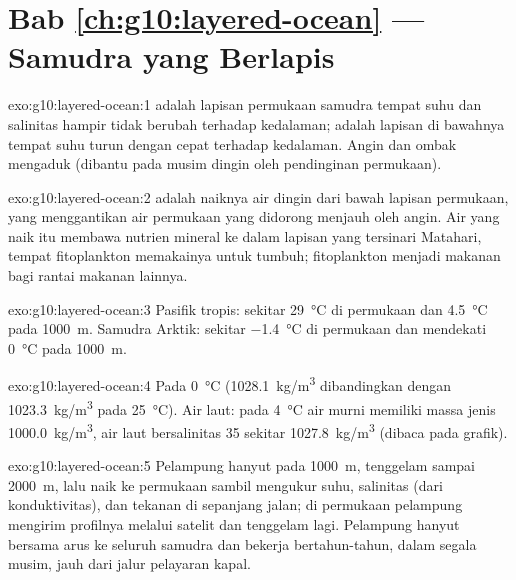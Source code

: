 \section*{Bab \ref{ch:g10:layered-ocean} --- Samudra yang Berlapis}

\begin{solution}{exo:g10:layered-ocean:1}
 adalah lapisan permukaan samudra tempat suhu dan salinitas
hampir tidak berubah terhadap kedalaman;  adalah lapisan di bawahnya
tempat suhu turun dengan cepat terhadap kedalaman. Angin dan ombak mengaduk
 (dibantu pada musim dingin oleh pendinginan permukaan).
\end{solution}

\begin{solution}{exo:g10:layered-ocean:2}
 adalah naiknya air dingin dari bawah lapisan permukaan,
yang menggantikan air permukaan yang didorong menjauh oleh angin. Air yang
naik itu membawa nutrien mineral ke dalam lapisan yang tersinari Matahari,
tempat fitoplankton memakainya untuk tumbuh; fitoplankton menjadi makanan bagi
rantai makanan lainnya.
\end{solution}

\begin{solution}{exo:g10:layered-ocean:3}
Pasifik tropis: sekitar \qty{29}{\degreeCelsius} di permukaan dan
\qty{4.5}{\degreeCelsius} pada \qty{1000}{m}. Samudra Arktik: sekitar
\qty{-1.4}{\degreeCelsius} di permukaan dan mendekati
\qty{0}{\degreeCelsius} pada \qty{1000}{m}.
\end{solution}

\begin{solution}{exo:g10:layered-ocean:4}
Pada \qty{0}{\degreeCelsius} (\qty{1028.1}{kg/m^3} dibandingkan dengan
\qty{1023.3}{kg/m^3} pada \qty{25}{\degreeCelsius}). Air laut: pada
\qty{4}{\degreeCelsius} air murni memiliki massa jenis \qty{1000.0}{kg/m^3},
air laut bersalinitas 35 sekitar \qty{1027.8}{kg/m^3} (dibaca pada grafik).
\end{solution}

\begin{solution}{exo:g10:layered-ocean:5}
Pelampung hanyut pada \qty{1000}{m}, tenggelam sampai \qty{2000}{m}, lalu naik
ke permukaan sambil mengukur suhu, salinitas (dari konduktivitas), dan tekanan
di sepanjang jalan; di permukaan pelampung mengirim profilnya melalui satelit
dan tenggelam lagi. Pelampung hanyut bersama arus ke seluruh samudra dan
bekerja bertahun-tahun, dalam segala musim, jauh dari jalur pelayaran kapal.
\end{solution}

